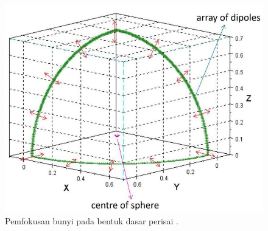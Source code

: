 \begin{figure}[t!]
    \centering
    \includegraphics[width=8 cm]{Gambar/fokusSuaraKowangan.jpg}
    \caption{Pemfokusan bunyi pada bentuk dasar perisai \kowangan \cite{alatMusikPersonal}.}
    \label{fig:fokusSuaraKowangan}
\end{figure}



